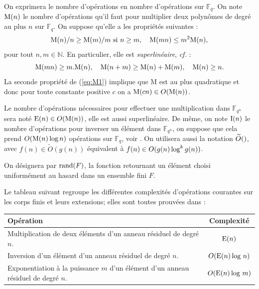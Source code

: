 \documentclass[a4paper]{article} %
\numberwithin{section}{part}
\numberwithin{equation}{section}
\newcommand\GF[1]{\mathbb{F}_{#1}}
\newcommand\NN{\mathbb{N}}
\newcommand\M[1]{\textup{M}(#1)}
\newcommand\E[1]{\textup{E}(#1)}
\newcommand\I[1]{\textup{I}(#1)}
\newcommand\tO[1]{\widetilde{O}(#1)}
\begin{document}
On exprimera le nombre d'opérations en nombre d'opérations sur $\GF{q}$. On note
$\M{n}$ le nombre d'opérations qu'il faut pour multiplier deux polynômes
de degré au plus $n$ sur $\GF{q}$. On suppose qu'elle a les propriétés suivantes
:
\begin{equation}
\label{eq:M1}
\M{n}/n\geq\M{m}/m\textup{ si }n\geq m,\quad \M{mn} \leq m^2\M{n},
\end{equation}
pour tout $n, m\in\NN$. En particulier, elle est \emph{superlinéaire}, 
\emph{cf.} \cite{GaGe} :
\begin{equation}
\M{mn}\geq m.\M{n},\quad \M{n + m}\geq\M{n} + \M{m}, \quad \M{n}\geq n.
\end{equation}
La seconde propriété de (\ref{eq:M1}) implique que M est au plus quadratique et 
donc pour toute constante positive $c$ on a $\M{cn}\in O(\M{n})$.\par
Le nombre d'opérations nécessaires pour effectuer une multiplication dans
$\GF{q^n}$ sera noté $\E{n}\in O(\M{n})$, elle est aussi superlinéaire. De même,
on note $\I{n}$ le nombre d'opérations pour inverser un élément dans $\GF{q^n}$,
on suppose que cela prend $O(\M{n}\,\textup{log\,}n)$ opérations sur $\GF{q}$,
voir \cite{GaGe}.
On utilisera aussi la notation $\tO$, avec $f(n)\in\tO{g(n)}$
équivalent à $f(n)\in O(g(n)\,\textup{log}^k\,g(n))$.
\begin{defn}
On désignera par $\textup{rand}(F)$, la fonction retournant un élément choisi
uniformément au hasard dans un ensemble fini $F$.
\end{defn}
Le tableau suivant regroupe les différentes complexités d'opérations courantes 
sur les corps finis et leurs extensions; elles sont toutes prouvées dans 
\cite{GaGe} :
\begin{center}
\begin{tabular}{|p{7cm}|c|}
    \hline
    Opération & Complexité\\
    \hline\hline
    Multiplication de deux éléments d'un anneau résiduel de degré $n$. & 
    $\E{n}$\\
    \hline
    Inversion d'un élément d'un anneau résiduel de degré $n$. &
    $O(\E{n}\,\textup{log }n)$\\
    \hline
    Exponentiation à la puissance $m$ d'un élément d'un anneau résiduel de degré
    $n$. & $O(\E{n}\,\textup{log }m)$\\
    \hline
\end{tabular}
\end{center}
\newpage
\end{document}
